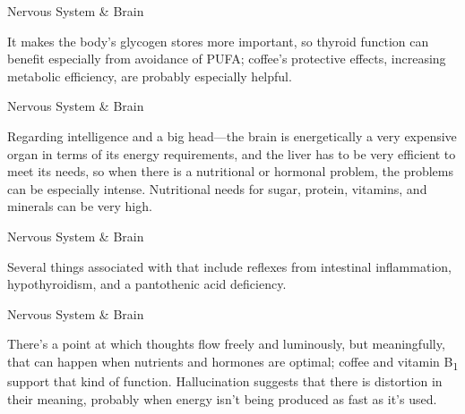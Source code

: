 \documentclass[11pt,oneside,openany,extrafontsizes]{memoir}
\begin{document}
\begin{standalonequote}{Nervous System \& Brain}

    \begin{answer}
        It makes the body's glycogen stores more important, so thyroid function can benefit especially from avoidance of PUFA; coffee's protective effects, increasing metabolic efficiency, are probably especially helpful.
    \end{answer}
\end{standalonequote}

\begin{standalonequote}{Nervous System \& Brain}

    \begin{answer}
        Regarding intelligence and a big head---the brain is energetically a very expensive organ in terms of its energy requirements, and the liver has to be very efficient to meet its needs, so when there is a nutritional or hormonal problem, the problems can be especially intense. Nutritional needs for sugar, protein, vitamins, and minerals can be very high.
    \end{answer}
\end{standalonequote}

\begin{standalonequote}{Nervous System \& Brain}

    \begin{answer}
        Several things associated with that include reflexes from intestinal inflammation, hypothyroidism, and a pantothenic acid deficiency.
    \end{answer}
\end{standalonequote}

\begin{standalonequote}{Nervous System \& Brain}

    \begin{answer}
        There's a point at which thoughts flow freely and luminously, but meaningfully, that can happen when nutrients and hormones are optimal; coffee and vitamin B\textsubscript{1} support that kind of function. Hallucination suggests that there is distortion in their meaning, probably when energy isn't being produced as fast as it's used.
    \end{answer}
\end{standalonequote}
\end{document}
